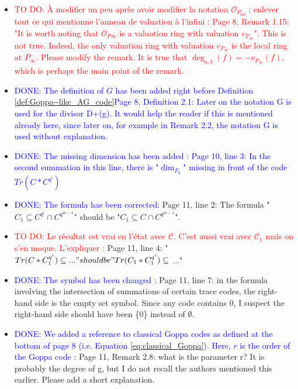 \documentclass[12pt,a4paper]{amsart}
\newcommand\TODO[1]{\textcolor{red}{TO DO: #1}}
\newcommand\DONE[1]{\textcolor{blue}{DONE: #1}}
\begin{document}
\begin{itemize}
\item  \TODO{À modifier un peu après avoir modifier la notation $\mathcal{O}_{P_{\inf}}$ : enlever tout ce qui mentionne l'anneau de valuation à l'infini : Page 8, Remark 1.15: "It is worth noting that $\mathcal{O}_{P\infty}$ is a valuation ring with valuation $v_{P_\infty}$". This is not true. Indeed, the only valuation ring with valuation $v_{P_\infty}$ is the local ring at $P_\infty$. Please modify the remark. It is true that $\deg_{a,b}(f)=-v_{P_\infty}(f)$, which is perhaps the main point of the remark.}

\item \DONE{The definition of $G$ has been added right before Definition \ref{def:Goppa--like_AG_code}Page 8, Definition 2.1: Later on the notation G is used for the divisor D+(g). It would help the reader if this is mentioned already here, since later on, for example in Remark 2.2, the notation G is used without explanation.}



\item \DONE{The missing dimension has been added : Page 10, line 3: In the second summation in this line, there is "$\dim_{F_{q}}$" missing in front of the code $Tr(C*C^{q^i})$}

\item \DONE{The formula has been corrected: }Page 11, line 2: The formula "$C_1 \subseteq C^{q^i} \cap C^{q^{m-1}}$" should be "$C_1 \subseteq C \cap C^{q^{m-1}}$". 

\item \TODO{Le résultat est vrai en l'état avec $\mathcal{C}$. C'est aussi vrai avec $\mathcal{C}_1$ mais on s'en moque. L'expliquer : }Page 11, line 4: "$Tr(C*C_1^{q^i}) \subseteq ..." should be "Tr(C_1*C_1^{q^i}) \subseteq$ ..."

\item \DONE{The symbol has been changed : }Page 11, line 7: in the formula involving the intersection of summations of certain trace codes, the right-hand side is the empty set symbol. Since any code contains 0, I suspect the right-hand side should have been \{0\} instead of $\emptyset$.

\item \DONE{ We added a reference to classical Goppa codes as defined at the bottom of page 8 (i.e. Equation \eqref{eq:classical_Goppa}). Here, $r$ is the order of the Goppa code : } Page 11, Remark 2.8: what is the parameter r? It is probably the degree of g, but I do not recall the authors mentioned this earlier. Please add a short explanation.


\end{itemize}
\end{document}
